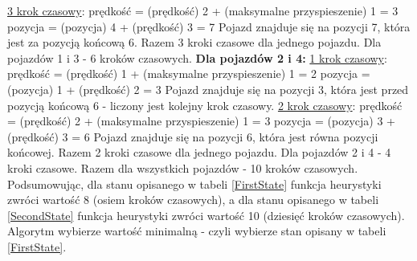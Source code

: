 \newline
\underline{3 krok czasowy}:
\newline
\newline
prędkość = (prędkość) 2 + (maksymalne przyspieszenie) 1 = 3
\newline
pozycja = (pozycja) 4 + (prędkość) 3 = 7
\newline
\newline
Pojazd znajduje się na pozycji 7, która jest za pozycją końcową 6.
\newline
\newline
Razem 3 kroki czasowe dla jednego pojazdu. Dla pojazdów 1 i 3 - 6 kroków czasowych.
\newline
\newline
\textbf{Dla pojazdów 2 i 4:}
\newline
\newline
\underline{1 krok czasowy}:
\newline
\newline
prędkość = (prędkość) 1 + (maksymalne przyspieszenie) 1 = 2
\newline
pozycja = (pozycja) 1 + (prędkość) 2 = 3
\newline
\newline
Pojazd znajduje się na pozycji 3, która jest przed pozycją końcową 6 - liczony jest kolejny krok czasowy.
\newline
\newline
\underline{2 krok czasowy}:
\newline
\newline
prędkość = (prędkość) 2 + (maksymalne przyspieszenie) 1 = 3
\newline
pozycja = (pozycja) 3 + (prędkość) 3 = 6
\newline
\newline
Pojazd znajduje się na pozycji 6, która jest równa pozycji końcowej.
\newline
\newline
Razem 2 kroki czasowe dla jednego pojazdu. Dla pojazdów 2 i 4 - 4 kroki czasowe.
\newline
\newline
Razem dla wszystkich pojazdów - 10 kroków czasowych.
\newline
\newline
\newline
Podsumowując, dla stanu opisanego w tabeli \ref{FirstState} funkcja heurystyki zwróci wartość 8 (osiem kroków czasowych), a dla stanu opisanego w tabeli \ref{SecondState} funkcja heurystyki zwróci wartość 10 (dziesięć kroków czasowych). Algorytm wybierze wartość minimalną - czyli wybierze stan opisany w tabeli \ref{FirstState}.

